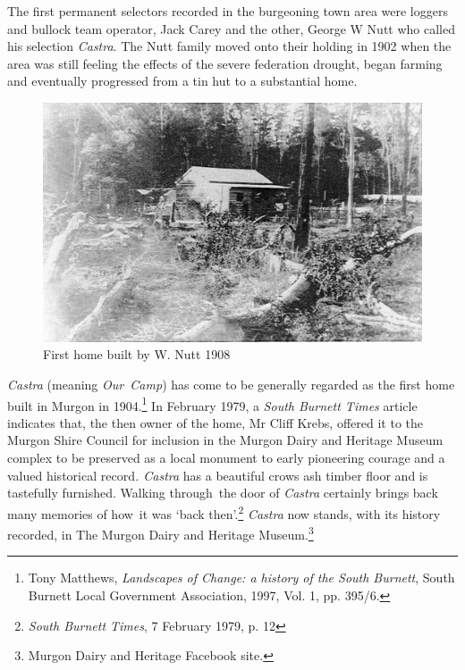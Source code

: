 The first permanent selectors recorded in the burgeoning town area were loggers and bullock team operator, Jack Carey and the other, George W Nutt who called his selection \emph{Castra}. The Nutt family moved onto their holding in 1902 when the area was still feeling the effects of the severe federation drought, began farming and eventually progressed from a tin hut to a substantial home.









\begin{figure}
\begin{center}
\includegraphics[width=1.\linewidth,center]{../images/HouseWNutt1908.jpg}
\caption{First home built by W. Nutt 1908}
\end{center}
\end{figure}




\emph{Castra} (meaning \emph{Our~Camp}) has come to be generally regarded as the first home built in Murgon in 1904.\footnote{Tony Matthews, \emph{Landscapes of Change: a history of the South Burnett}, South Burnett Local Government Association, 1997, Vol. 1, pp. 395/6.} In February 1979, a \emph{South Burnett Times} article indicates that, the then owner of the home, Mr Cliff Krebs, offered it to the Murgon Shire Council for inclusion in the Murgon Dairy and Heritage Museum complex to be preserved as a local monument to early pioneering courage and a valued historical record\emph{. Castra} has a beautiful crows ash timber floor and is tastefully furnished. Walking through~the door of \emph{Castra} certainly brings back many memories of how~it was `back then'.\footnote{\emph{South Burnett Times}, 7 February 1979, p. 12} \emph{Castra} now stands, with its history recorded, in The Murgon Dairy and Heritage Museum.\footnote{Murgon Dairy and Heritage Facebook site.}








